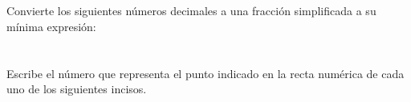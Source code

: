 \documentclass[12pt,addpoints,answers]{evalua}
\begin{document}
\begin{questions}
    \subsection*{\else{}\fi}
    \question[4] Convierte los siguientes números decimales a una fracción simplificada a su mínima expresión:
    \begin{multicols}{2}
    \end{multicols}

    \newpage

    \section*{\else{}\fi}
    \subsection*{\else{}\fi}
    \question[4] Escribe el número que representa el punto indicado en la recta numérica de cada uno de los siguientes incisos.

    \begin{multicols}{2}
    \end{multicols}


\end{questions}
\end{document}
